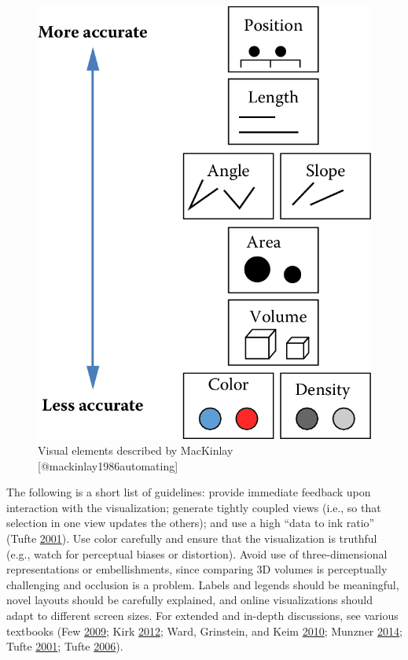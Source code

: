 \documentclass[]{krantz}
\begin{document}
\begin{figure}

{\centering \includegraphics[width=0.7\linewidth]{ChapterViz/figures/fig9-4} 

}

\caption{Visual elements described by MacKinlay [@mackinlay1986automating]}\label{fig:fig9-4}
\end{figure}

\vspace*{-8pt} The following is a short list of guidelines: provide
immediate feedback upon interaction with the visualization; generate
tightly coupled views (i.e., so that selection in one view updates the
others); and use a high ``data to ink ratio'' (Tufte
\protect\hyperlink{ref-edward2001visual}{2001}). Use color carefully and
ensure that the visualization is truthful (e.g., watch for perceptual
biases or distortion). Avoid use of three-dimensional representations or
embellishments, since comparing 3D volumes is perceptually challenging
and occlusion is a problem. Labels and legends should be meaningful,
novel layouts should be carefully explained, and online visualizations
should adapt to different screen sizes. For extended and in-depth
discussions, see various textbooks (Few
\protect\hyperlink{ref-few2009now}{2009}; Kirk
\protect\hyperlink{ref-kirk2012data}{2012}; Ward, Grinstein, and Keim
\protect\hyperlink{ref-ward2010interactive}{2010}; Munzner
\protect\hyperlink{ref-munzner2014visualization}{2014}; Tufte
\protect\hyperlink{ref-edward2001visual}{2001}; Tufte
\protect\hyperlink{ref-edward2006beauty}{2006}).
\end{document}
